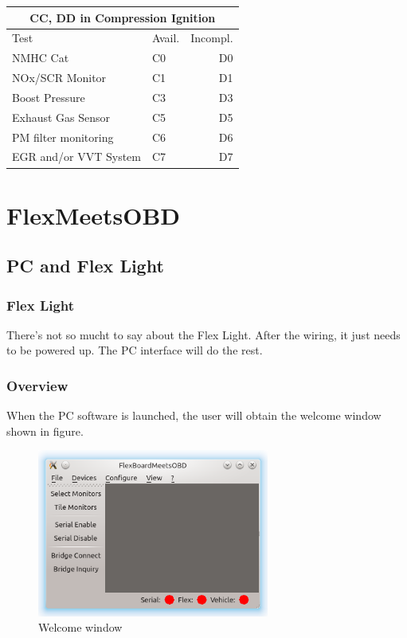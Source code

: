 \documentclass[twoside]{article}
\begin{document}
\begin{multicols}{2}
\begin{table}[H]
\centering
\begin{tabular}{llr}
\multicolumn{3}{c}{CC, DD in Compression Ignition} \\
\toprule
Test & Avail. & Incompl. \\
\midrule
NMHC Cat & C0 & D0 \\
NOx/SCR Monitor & C1 & D1 \\
Boost Pressure & C3 & D3 \\
Exhaust Gas Sensor & C5 & D5 \\
PM filter monitoring & C6 & D6 \\
EGR and/or VVT System & C7 & D7 \\
\bottomrule
\end{tabular}
\end{table}

\section{FlexMeetsOBD}

\subsection{PC and Flex Light}

\subsubsection{Flex Light}

There's not so mucht to say about the Flex Light. After the wiring, it just needs to be powered up. The PC interface will do the rest.

\subsubsection{Overview}

When the PC software is launched, the user will obtain the welcome window shown in figure.

\begin{figure}[H]
  \centering
  \includegraphics[width=3in]{img/GUI/welcome_window}
  \caption{Welcome window}
\end{figure}


\end{multicols}
\end{document}
